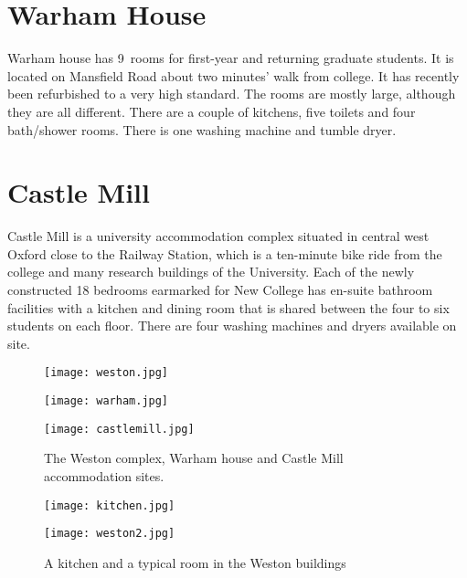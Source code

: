 \section{Warham House}
Warham house has 9~rooms for first-year and returning graduate students. It is located on Mansfield Road about two minutes' walk from college. It has recently been refurbished to a very high standard. The rooms are mostly large, although they are all different. There are a couple of kitchens, five toilets and four bath/shower rooms. There is one washing machine and tumble dryer.

\section{Castle Mill}
Castle Mill is a university accommodation complex situated in
central west Oxford close to the Railway Station, which is a ten-minute bike ride from the college and many research buildings of
the University. Each of the newly constructed 18 bedrooms earmarked for New
College has en-suite bathroom facilities with a kitchen and dining room that is shared between
the four to six students on each floor. There are four washing machines and
dryers available on site.

\begin{figure}[htbp]
\centering
		\begin{minipage}{0.28\textwidth}
                \texttt{[image: weston.jpg]}
        \end{minipage}%
        \quad
        \begin{minipage}{0.28\textwidth}
                \texttt{[image: warham.jpg]}
        \end{minipage}%
        \quad
        \begin{minipage}{0.35\textwidth}      
                \texttt{[image: castlemill.jpg]}
        \end{minipage}%
        \caption[]{The Weston complex,
        Warham house and Castle Mill accommodation sites.}
        \label{fig:accomm}
\end{figure}

\begin{figure}[htbp]
\centering
		\begin{minipage}{0.50\textwidth}
                \texttt{[image: kitchen.jpg]}
        \end{minipage}%
        \quad
        \begin{minipage}{0.46\textwidth}
                \texttt{[image: weston2.jpg]}
        \end{minipage}%
\caption[]{A kitchen and a typical room
in the Weston buildings}
\label{fig:weston}
\end{figure}

